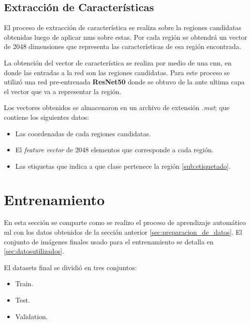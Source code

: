 \subsection{Extracción de Características}\label{sub:extracciondecaracteristica}

El proceso de extracción de característica se realiza sobre la regiones candidatas obtenidas luego de aplicar \ac{nms} sobre estas. Por cada región se obtendrá un vector de 2048 dimensiones que representa las características de esa región encontrada.

La obtención del vector de característica se realiza por medio de una \ac{cnn}, en donde las entradas a la red son las regiones candidatas. Para este proceso se utilizó una red pre-entrenada \textbf{ResNet50} donde se obtuvo de la ante ultima capa el vector que va a representar la región.

Los vectores obtenidos se almacenaron en un archivo de extensión \textit{.mat}; que contiene los siguientes datos:
\begin{itemize}
 \item Las coordenadas de cada regiones candidatas.
 \item El \textit{feature vector} de 2048 elementos que corresponde a cada región. 
 \item Las etiquetas que indica a que clase pertenece la región \ref{sub:etiquetado}.
\end{itemize}





\section{Entrenamiento}\label{sec:entrenamiento}

En esta sección se comparte como se realizo el proceso de aprendizaje automático \ac{ml} con los datos obtenidos de la sección anterior \ref{sec:preparacion_de_datos}. El conjunto de imágenes finales usado para el entrenamiento se detalla en \ref{sec:datosutilizados}.

El datasets final se dividió en tres conjuntos:
\begin{itemize}
\item Train.
\item Test.
\item Validation.
\end{itemize}

